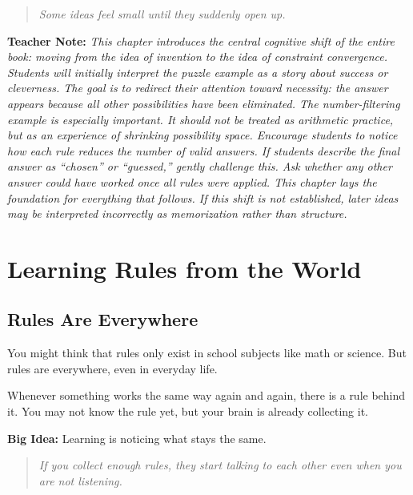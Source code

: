 \documentclass[12pt]{book}
\newenvironment{teachernote}
{\par\medskip\noindent\textbf{Teacher Note:} \itshape}
{\par\medskip}
\begin{document}
\begin{quote}\itshape
Some ideas feel small until they suddenly open up.
\end{quote}

\begin{teachernote}
This chapter introduces the central cognitive shift of the entire book:
moving from the idea of invention to the idea of constraint convergence.
Students will initially interpret the puzzle example as a story about
success or cleverness. The goal is to redirect their attention toward
necessity: the answer appears because all other possibilities have been
eliminated. The number-filtering example is especially important. It should
not be treated as arithmetic practice, but as an experience of shrinking
possibility space. Encourage students to notice how each rule reduces the
number of valid answers. If students describe the final answer as
``chosen'' or ``guessed,'' gently challenge this. Ask whether any other
answer could have worked once all rules were applied. This chapter lays
the foundation for everything that follows. If this shift is not
established, later ideas may be interpreted incorrectly as memorization
rather than structure.
\end{teachernote}

\chapter{Learning Rules from the World}

\section{Rules Are Everywhere}

You might think that rules only exist in school subjects like math or
science. But rules are everywhere, even in everyday life.

Whenever something works the same way again and again, there is a rule
behind it. You may not know the rule yet, but your brain is already
collecting it.

\textbf{Big Idea:} Learning is noticing what stays the same.

\begin{quote}\itshape
If you collect enough rules, they start talking to each other
even when you are not listening.
\end{quote}
\end{document}
